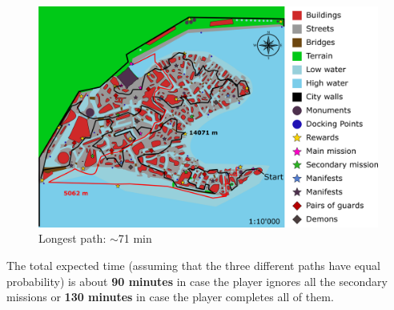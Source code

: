 \begin{figure}[H]
    \centering
	\includegraphics[width=\textwidth]{Images/Diagrams/dynamiapath3.png}
	\caption{Longest path: $\sim$71 min}
\end{figure}

The total expected time (assuming that the three different paths have equal probability) is about \textbf{90 minutes} in case the player ignores all the secondary missions or \textbf{130 minutes} in case the player completes all of them.
